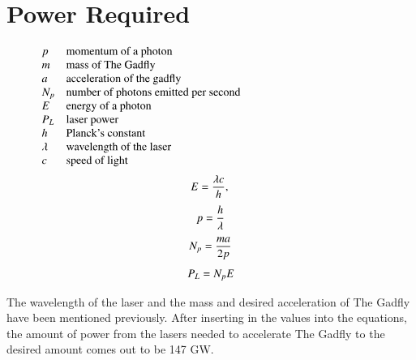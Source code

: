 \documentclass{aa}
\begin{document}
\section{Power Required}
\[
      \begin{array}{lp{0.8\linewidth}}
         p  & momentum of a photon     \\
         m  & mass of The Gadfly                    \\
         a  & acceleration of the gadfly				\\
         N_{p} & number of photons emitted per second  \\
         E  & energy of a photon \\
         P_{L}  & laser power \\
         h  & Planck's constant \\
         \lambda & wavelength of the laser \\
         c  & speed of light\\
         \end{array}
\]
 \begin{equation}
      E = \frac{\lambda c}{h},  \\
 \end{equation}
 \begin{equation}
 	  p = \frac{h}{\lambda}   \\
 \end{equation}
  \begin{equation}
 	  N_{p} = \frac{ma}{2p}   \\
 \end{equation}
 \begin{equation}
 	  P_{L} = N_{p}E\\
 \end{equation}

The wavelength of the laser and the mass and desired acceleration of The Gadfly have been mentioned previously. After inserting in the values into the equations, the amount of power from the lasers needed to accelerate The Gadfly to the desired amount comes out to be 147 GW. 
 
\end{document}
